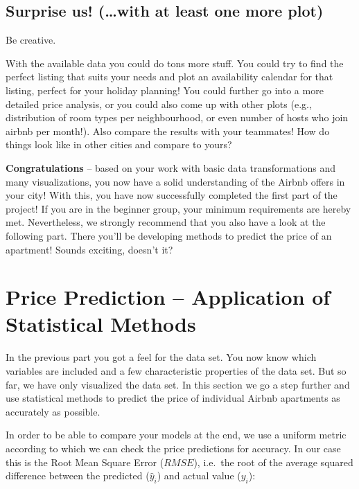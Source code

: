 \documentclass[
  11pt,
]{article}
\begin{document}
\hypertarget{surprise-us-with-at-least-one-more-plot}{%
\subsection{Surprise us! (\ldots with at least one more plot)}\label{surprise-us-with-at-least-one-more-plot}}

Be creative.

With the available data you could do tons more stuff. You could try to find the perfect listing that suits your needs and plot an availability calendar for that listing, perfect for your holiday planning! You could further go into a more detailed price analysis, or you could also come up with other plots (e.g., distribution of room types per neighbourhood, or even number of hosts who join airbnb per month!). Also compare the results with your teammates! How do things look like in other cities and compare to yours?

\textbf{Congratulations} -- based on your work with basic data transformations and many visualizations, you now have a solid understanding of the Airbnb offers in your city! With this, you have now successfully completed the first part of the project! If you are in the beginner group, your minimum requirements are hereby met. Nevertheless, we strongly recommend that you also have a look at the following part. There you'll be developing methods to predict the price of an apartment! Sounds exciting, doesn't it?

\newpage

\hypertarget{price-prediction-application-of-statistical-methods}{%
\section{Price Prediction -- Application of Statistical Methods}\label{price-prediction-application-of-statistical-methods}}

In the previous part you got a feel for the data set. You now know which variables are included and a few characteristic properties of the data set. But so far, we have only visualized the data set. In this section we go a step further and use statistical methods to predict the price of individual Airbnb apartments as accurately as possible.

In order to be able to compare your models at the end, we use a uniform metric according to which we can check the price predictions for accuracy. In our case this is the Root Mean Square Error (\(RMSE\)), i.e.~the root of the average squared difference between the predicted (\(\hat{y}_i\)) and actual value (\(y_i\)):
\end{document}
